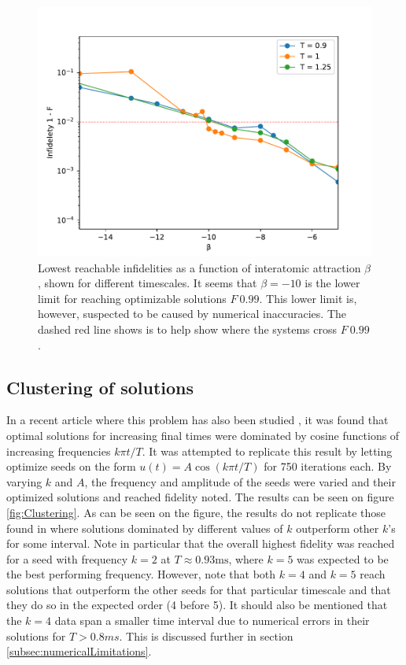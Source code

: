 \documentclass[a4paper, twocolumn]{revtex4-1}
\begin{document}
\begin{figure}
	\includegraphics[width=\columnwidth]{graphics/exploration/reachable_neg_beta.pdf}
	\caption{Lowest reachable infidelities as a function of interatomic attraction $\beta$, shown for different timescales. It seems that $\beta=-10$ is the lower limit for reaching optimizable solutions $F~0.99$. This lower limit is, however, suspected to be caused by numerical inaccuracies. The dashed red line shows is to help show where the systems cross $F~0.99$.}
	\label{fig:reachable_neg_betas}
\end{figure}

\subsection{\label{subsec:clustering}Clustering of solutions}
In a recent article where this problem has also been studied \cite{QM2Paper}, it was found that optimal solutions for increasing final times were dominated by cosine functions of increasing frequencies $k\pi t/T$. It was attempted to replicate this result by letting  optimize seeds on the form $u(t) = A\cos(k\pi t/T)$ for 750 iterations each. By varying $k$ and $A$, the frequency and amplitude of the seeds were varied and their optimized solutions and reached fidelity noted. The results can be seen on figure \ref{fig:Clustering}. As can be seen on the figure, the results do not replicate those found in \cite{QM2Paper} where solutions dominated by different values of $k$ outperform other $k$'s for some interval. Note in particular that the overall highest fidelity was reached for a seed with frequency $k=2$ at $ T\approx 0.93 \text{ms} $, where $ k=5 $ was expected to be the best performing frequency. However, note that both $k=4$ and $k=5$ reach solutions that outperform the other seeds for that particular timescale and that they do so in the expected order (4 before 5). It should also be mentioned that the $k=4$ data span a smaller time interval due to numerical errors in their solutions for $T>0.8 ms$. This is discussed further in section \ref{subsec:numericalLimitations}. \\
\end{document}
